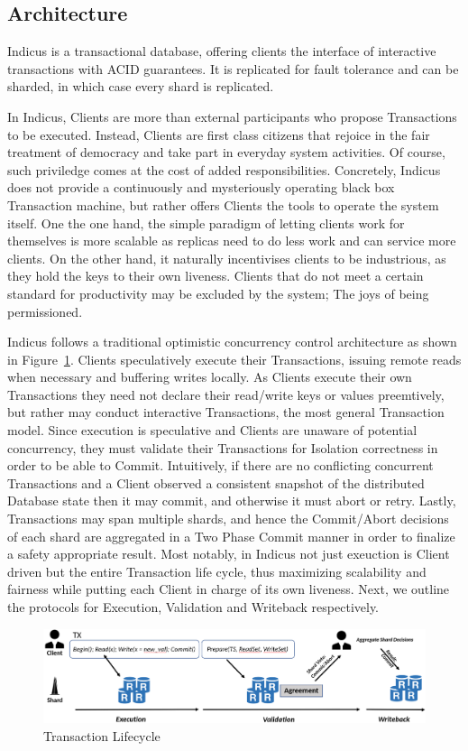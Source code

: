 \subsection{Architecture}
Indicus is a transactional database, offering clients the interface of interactive transactions with ACID guarantees. It is replicated for fault tolerance and can be sharded, in which case every shard is replicated. 

In Indicus, Clients are more than external participants who propose Transactions to be executed. Instead, Clients are first class citizens that rejoice in the fair treatment of democracy and take part in everyday system activities. Of course, such priviledge comes at the cost of added responsibilities. Concretely, Indicus does not provide a continuously and mysteriously operating black box Transaction machine, but rather offers Clients the tools to operate the system itself. One the one hand, the simple paradigm of letting clients work for themselves is more scalable as replicas need to do less work and can service more clients. On the other hand, it naturally incentivises clients to be industrious, as they hold the keys to their own liveness. Clients that do not meet a certain standard for productivity may be excluded by the system; The joys of being permissioned.

Indicus follows a traditional optimistic concurrency control architecture as shown in Figure~\ref{fig:Figure1}. Clients speculatively execute their Transactions, issuing remote reads when necessary and buffering writes locally. As Clients execute their own Transactions they need not declare their read/write keys or values preemtively, but rather may conduct interactive Transactions, the most general Transaction model. Since execution is speculative and Clients are unaware of potential concurrency, they must validate their Transactions for Isolation correctness in order to be able to Commit. Intuitively, if there are no conflicting concurrent Transactions and a Client observed a consistent snapshot of the distributed Database state then it may commit, and otherwise it must abort or retry. Lastly, Transactions may span multiple shards, and hence the Commit/Abort decisions of each shard are aggregated in a Two Phase Commit manner in order to finalize a safety appropriate result. Most notably, in Indicus not just exeuction is Client driven but the entire Transaction life cycle, thus maximizing scalability and fairness while putting each Client in charge of its own liveness.
Next, we outline the protocols for Execution, Validation and Writeback respectively.

\begin{figure}
\begin{center}
\includegraphics[width= \textwidth]{./figures/LC.png}
\end{center}
\caption{Transaction Lifecycle}
\label{fig:Figure1}
\end{figure}
